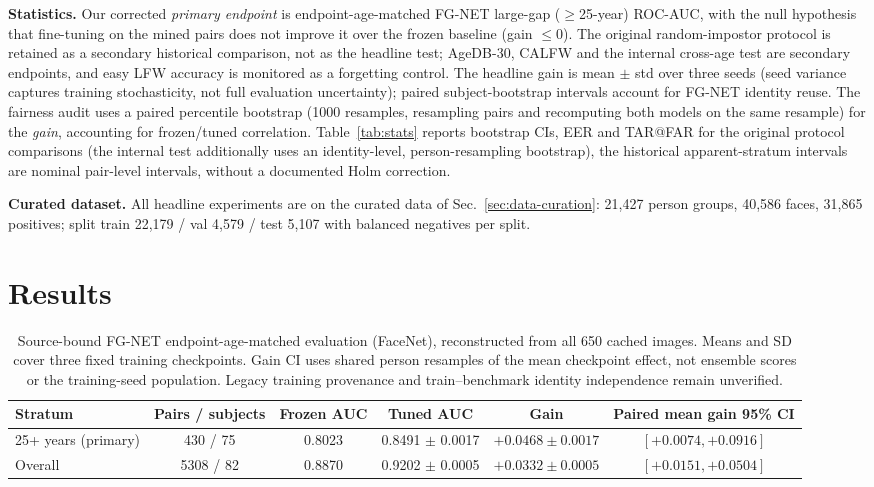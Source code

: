 \documentclass[journal]{IEEEtran}
\begin{document}
\textbf{Statistics.} Our corrected \emph{primary endpoint} is endpoint-age-matched FG-NET large-gap ($\geq$25-year) ROC-AUC, with the null hypothesis that fine-tuning on the mined pairs does not improve it over the frozen baseline (gain $\leq 0$). The original random-impostor protocol is retained as a secondary historical comparison, not as the headline test; AgeDB-30, CALFW and the internal cross-age test are secondary endpoints, and easy LFW accuracy is monitored as a forgetting control. The headline gain is mean $\pm$ std over three seeds (seed variance captures training stochasticity, not full evaluation uncertainty); paired subject-bootstrap intervals account for FG-NET identity reuse. The fairness audit uses a paired percentile bootstrap (1000 resamples, resampling pairs and recomputing both models on the same resample) for the \emph{gain}, accounting for frozen/tuned correlation. Table~\ref{tab:stats} reports bootstrap CIs, EER and TAR@FAR for the original protocol comparisons (the internal test additionally uses an identity-level, person-resampling bootstrap), the historical apparent-stratum intervals are nominal pair-level intervals, without a documented Holm correction.

\textbf{Curated dataset.} All headline experiments are on the curated data of Sec.~\ref{sec:data-curation}: 21{,}427 person groups, 40{,}586 faces, 31{,}865 positives; split train 22{,}179 / val 4{,}579 / test 5{,}107 with balanced negatives per split.

\section{Results}\label{sec:results}
\begin{table}[!t]
\caption{Source-bound FG-NET endpoint-age-matched evaluation (FaceNet), reconstructed from all 650 cached images. Means and SD cover three fixed training checkpoints. Gain CI uses shared person resamples of the mean checkpoint effect, not ensemble scores or the training-seed population. Legacy training provenance and train--benchmark identity independence remain unverified.}
\label{tab:endpoint}
\centering\footnotesize
\begin{tabular}{@{}lccccc@{}}
\toprule
Stratum & Pairs / subjects & Frozen AUC & Tuned AUC & Gain & Paired mean gain 95\% CI \\
\midrule
25+ years (primary) & 430 / 75 & 0.8023 & 0.8491 $\pm$ 0.0017 & $+0.0468\pm0.0017$ & $[+0.0074,+0.0916]$ \\
Overall & 5308 / 82 & 0.8870 & 0.9202 $\pm$ 0.0005 & $+0.0332\pm0.0005$ & $[+0.0151,+0.0504]$ \\
\bottomrule
\end{tabular}
\end{table}
\end{document}
